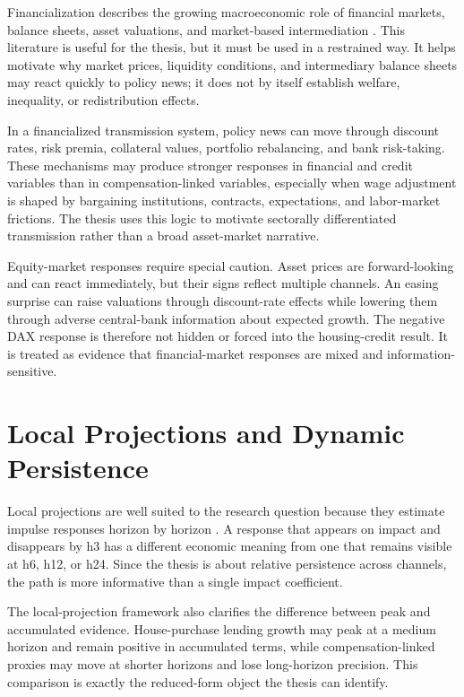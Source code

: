 Financialization describes the growing macroeconomic role of financial markets, balance sheets, asset valuations, and market-based intermediation \parencite{Epstein2005,Krippner2005,VanDerZwan2014}. This literature is useful for the thesis, but it must be used in a restrained way. It helps motivate why market prices, liquidity conditions, and intermediary balance sheets may react quickly to policy news; it does not by itself establish welfare, inequality, or redistribution effects.

In a financialized transmission system, policy news can move through discount rates, risk premia, collateral values, portfolio rebalancing, and bank risk-taking. These mechanisms may produce stronger responses in financial and credit variables than in compensation-linked variables, especially when wage adjustment is shaped by bargaining institutions, contracts, expectations, and labor-market frictions. The thesis uses this logic to motivate sectorally differentiated transmission rather than a broad asset-market narrative.

Equity-market responses require special caution. Asset prices are forward-looking and can react immediately, but their signs reflect multiple channels. An easing surprise can raise valuations through discount-rate effects while lowering them through adverse central-bank information about expected growth. The negative DAX response is therefore not hidden or forced into the housing-credit result. It is treated as evidence that financial-market responses are mixed and information-sensitive.

\section{Local Projections and Dynamic Persistence}

Local projections are well suited to the research question because they estimate impulse responses horizon by horizon \parencite{Jorda2005}. A response that appears on impact and disappears by h3 has a different economic meaning from one that remains visible at h6, h12, or h24. Since the thesis is about relative persistence across channels, the path is more informative than a single impact coefficient.

The local-projection framework also clarifies the difference between peak and accumulated evidence. House-purchase lending growth may peak at a medium horizon and remain positive in accumulated terms, while compensation-linked proxies may move at shorter horizons and lose long-horizon precision. This comparison is exactly the reduced-form object the thesis can identify.

